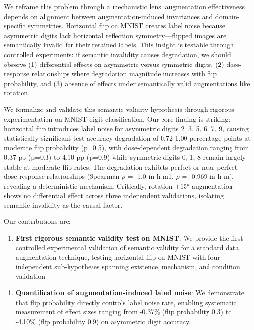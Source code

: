We reframe this problem through a mechanistic lens: augmentation effectiveness depends on alignment between augmentation-induced invariances and domain-specific symmetries. Horizontal flip on MNIST creates label noise because asymmetric digits lack horizontal reflection symmetry---flipped images are semantically invalid for their retained labels. This insight is testable through controlled experiments: if semantic invalidity causes degradation, we should observe (1) differential effects on asymmetric versus symmetric digits, (2) dose-response relationships where degradation magnitude increases with flip probability, and (3) absence of effects under semantically valid augmentations like rotation.

We formalize and validate this semantic validity hypothesis through rigorous experimentation on MNIST digit classification. Our core finding is striking: horizontal flip introduces label noise for asymmetric digits {2, 3, 5, 6, 7, 9}, causing statistically significant test accuracy degradation of 0.72-1.00 percentage points at moderate flip probability (p=0.5), with dose-dependent degradation ranging from 0.37 pp (p=0.3) to 4.10 pp (p=0.9) while symmetric digits {0, 1, 8} remain largely stable at moderate flip rates. The degradation exhibits perfect or near-perfect dose-response relationships (Spearman $\rho$ = -1.0 in h-m1, $\rho$ = -0.969 in h-m), revealing a deterministic mechanism. Critically, rotation $\pm 15$° augmentation shows no differential effect across three independent validations, isolating semantic invalidity as the causal factor.

Our contributions are:

\begin{enumerate}
\item \textbf{First rigorous semantic validity test on MNIST}: We provide the first controlled experimental validation of semantic validity for a standard data augmentation technique, testing horizontal flip on MNIST with four independent sub-hypotheses spanning existence, mechanism, and condition validation.
\end{enumerate}

\begin{enumerate}
\item \textbf{Quantification of augmentation-induced label noise}: We demonstrate that flip probability directly controls label noise rate, enabling systematic measurement of effect sizes ranging from -0.37\% (flip probability 0.3) to -4.10\% (flip probability 0.9) on asymmetric digit accuracy.
\end{enumerate}

